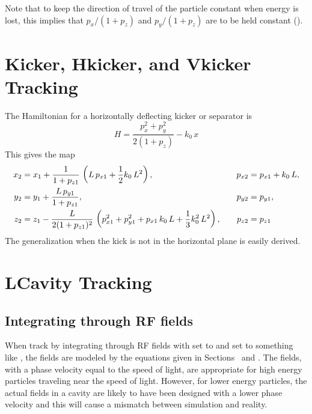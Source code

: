 Note that to keep the direction of travel of the particle constant when energy is lost, this implies
that $p_x/(1+p_z)$ and $p_y/(1+p_z)$ are to be held constant ().

\section{Kicker, Hkicker, and Vkicker Tracking}
\label{s:kicker.std}

The Hamiltonian for a horizontally deflecting kicker or separator is
\begin{equation}
  H = \frac{p_x^2 + p_y^2}{2 (1 + p_z)} - k_0 \, x 
\end{equation}
This gives the map
\begin{alignat}{2}
  x_2 &= x_1 + \frac{1}{1 + p_{z1}} \, \left( L \, p_{x1} + \frac{1}{2} k_0 \, L^2 \right), &
    p_{x2} &= p_{x1} + k_0 \, L, \nonumber \\
  y_2 &= y_1 + \frac{L \, p_{y1}}{1 + p_{z1}}, &
    p_{y2} &= p_{y1},  \\
  z_2 &= z_1 - \frac{L}{2 (1 + p_{z1})^2} \, 
    \left( p_{x1}^2 + p_{y1}^2 + p_{x1} \, k_0 \, L + \frac{1}{3} k_0^2 \, L^2 \right), \quad &
  p_{z2} &= p_{z1} \nonumber
\end{alignat}
The generalization when the kick is not in the horizontal plane is easily derived.

\section{LCavity Tracking}
\label{s:lcavity.std}

\subsection{Integrating through RF fields}

When track by integrating through RF fields with  set to  and
 set to something like , the fields are modeled by the equations
given in Sections~ and . The  fields, with a
phase velocity equal to the speed of light, are appropriate for high energy particles traveling near
the speed of light. However, for lower energy particles, the actual fields in a cavity are likely to
have been designed with a lower phase velocity and this will cause a mismatch between simulation and
reality.

